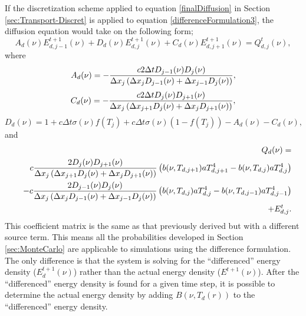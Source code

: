 	If the discretization scheme applied to equation \ref{finalDiffusion} in Section \ref{sec:Transport-Discret} is applied to equation \ref{differenceFormulation3}, the diffusion equation would take on the following form;
	\begin{equation}
	\label{disDiff_d}
	A_d(\nu)E_{d,{j-1}}^{t+1}(\nu) + D_d(\nu)E_{d,j}^{t+1}(\nu) + C_d(\nu)E_{d,{j+1}}^{t+1}(\nu) = Q_{d,j}^t(\nu),
	\end{equation}
	where
	\begin{equation}
	\label{distDiffA_d}
	A_d(\nu)=-{c2\Delta{t}D_{j-1}(\nu)D_{j}(\nu)\over{\Delta{x_j}\left(\Delta{x_{j}}D_{j-1}(\nu)+\Delta{x_{j-1}}D_{j}(\nu)\right)}},
	\end{equation}
	\begin{equation}
	\label{distDiffC_d}
	C_d(\nu)=-{c2\Delta{t}D_{j}(\nu)D_{j+1}(\nu)\over{\Delta{x_j}\left(\Delta{x_{j+1}}D_{j}(\nu)+\Delta{x_{j}}D_{j+1}(\nu)\right)}},
	\end{equation}
	\begin{equation}
	\label{distDiffD_d}
	D_d(\nu)=1+c\Delta{t}\sigma(\nu){f(T_j)}+c\Delta{t}\sigma(\nu){(1-f(T_j))} -A_d(\nu) -C_d(\nu), 
	\end{equation}
	and
	\begin{eqnarray}
	\label{distDiffQ_d}
	& &Q_d(\nu)=\nonumber \\& & c{2D_j(\nu)D_{j+1}(\nu)\over{\Delta{x_j}\left(\Delta{x_{j+1}}D_j(\nu)+\Delta{x_{j}}D_{j+1}(\nu)\right)}}\left(b(\nu,T_{d,{j+1}})aT_{d,{j+1}}^4-b(\nu,T_{d,{j}})aT_{d,{j}}^4\right)\nonumber \\ & & -c{2D_{j-1}(\nu)D_{j}(\nu)\over{\Delta{x_j}\left(\Delta{x_{j}}D_{j-1}(\nu)+\Delta{x_{j-1}}D_{j}(\nu)\right)}}\left(b(\nu,T_{d,{j}})aT_{d,{j}}^4-b(\nu,T_{d,{j-1}})aT_{d,{j-1}}^4\right)\nonumber \\ & &+E_{d,j}^t.
	\end{eqnarray}
	This coefficient matrix is the same as that previously derived but with a different source term. This means all the probabilities developed in Section \ref{sec:MonteCarlo} are applicable to simulations using the difference formulation. The only difference is that the system is solving for the ``differenced'' energy density ($E_d^{t+1}(\nu)$)  rather than the actual energy density ($E^{t+1}(\nu)$). After the ``differenced'' energy density is found for a given time step, it is possible to determine the actual energy density by adding $B(\nu,T_d(r))$ to the ``differenced'' energy density.

\belowSubSecSkip

